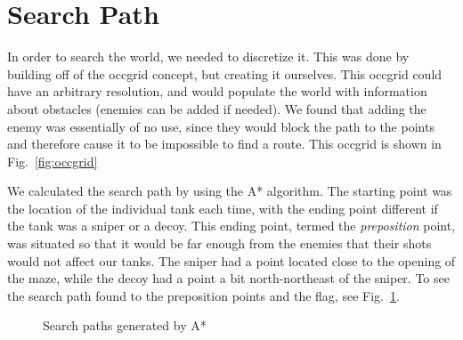 \documentclass{article}
\begin{document}
\section{Search Path}
In order to search the world, we needed to discretize it.  This was done by building off of the occgrid concept, but creating it ourselves.  This occgrid could have an arbitrary resolution, and would populate the world with information about obstacles (enemies can be added if needed).  We found that adding the enemy was essentially of no use, since they would block the path to the points and therefore cause it to be impossible to find a route.  This occgrid is shown in Fig.~\ref{fig:occgrid}

We calculated the search path by using the A* algorithm.  The starting point was the location of the individual tank each time, with the ending point different if the tank was a sniper or a decoy.  This ending point, termed the \emph{preposition} point, was situated so that it would be far enough from the enemies that their shots would not affect our tanks.  The sniper had a point located close to the opening of the maze, while the decoy had a point a bit north-northeast of the sniper. To see the search path found to the preposition points and the flag, see Fig.~\ref{fig:searchpaths}.
\begin{figure}[h!]
	\caption{Search paths generated by A*}
	\label{fig:searchpaths}
\end{figure}
\end{document}

